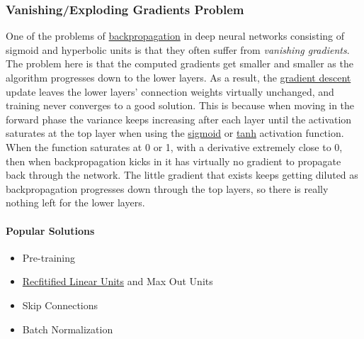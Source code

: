\documentclass[12pt]{article}
\begin{document}
        \subsubsection{Vanishing/Exploding Gradients Problem} \label{sec:VanishingProblem}
            One of the problems of \hyperref[sec:Backprop]{backpropagation} in deep neural networks consisting of sigmoid
            and hyperbolic units is that they often suffer from \textit{vanishing gradients}. The problem here is that the
            computed gradients get smaller and smaller as the algorithm progresses down to the lower layers. As a result,
            the \hyperref[sec:GD]{gradient descent} update leaves the lower layers' connection weights virtually unchanged,
            and training never converges to a good solution. This is because when moving in the forward phase the
            variance keeps increasing after each layer until the activation saturates at the top layer when using the
            \hyperref[sec:Sigmoid]{sigmoid} or \hyperref[sec:Tanh]{tanh} activation function. When the function
            saturates at 0 or 1, with a derivative extremely close to 0, then when backpropagation kicks in it has
            virtually no gradient to propagate back through the network. The little gradient that exists keeps getting
            diluted as backpropagation progresses down through the top layers, so there is really nothing left for the
            lower layers.
            
            \paragraph{Popular Solutions}
                \begin{itemize}
                    \item Pre-training
                    \item \hyperref[sec:RelU]{Recfitified Linear Units} and Max Out Units
                    \item Skip Connections
                    \item Batch Normalization
                \end{itemize}

\printindex
\end{document}
